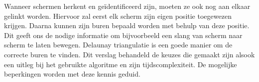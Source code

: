 Wanneer schermen herkent en geïdentificeerd zijn, moeten ze ook nog aan elkaar gelinkt worden. Hiervoor zal eerst elk scherm zijn eigen positie toegewezen krijgen. Daarna kunnen zijn buren bepaald worden met behulp van deze positie. Dit geeft ons de nodige informatie om bijvoorbeeld een slang van scherm naar scherm te laten bewegen. Delaunay triangulatie is een goede manier om de correcte buren te vinden. Dit verslag behandeld de keuzes die gemaakt zijn alsook een uitleg bij het gebruikte algoritme en zijn tijdscomplexiteit. De mogelijke beperkingen worden met deze kennis geduid.